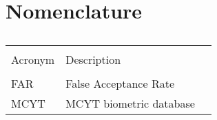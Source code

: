 \chapter{Nomenclature}


\begin{table}[ht]
\caption[Nomenclature]{\textsc{}} %
\centering %
\begin{tabular}{l l l} %
\hline\hline\\ %
 Acronym & Description \\ [0.5ex] %
\hline\\ %
FAR & False Acceptance Rate \\
 MCYT &  MCYT biometric database\\[1ex] %
\hline %
\end{tabular}
\normalsize
\label{table:nomenclature} %
\end{table}

